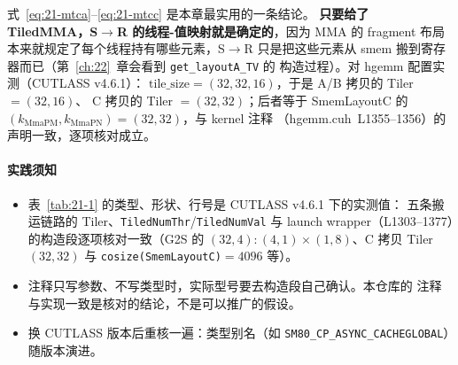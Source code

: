 式~\eqref{eq:21-mtca}--\eqref{eq:21-mtcc} 是本章最实用的一条结论。
\textbf{只要给了 TiledMMA，S$\to$R 的线程-值映射就是确定的}，因为 MMA 的
fragment 布局本来就规定了每个线程持有哪些元素，S$\to$R 只是把这些元素从
smem 搬到寄存器而已（第~\ref{ch:22}~章会看到 \texttt{get\_\allowbreak{}layout\allowbreak{}A\_\allowbreak{}TV} 的
构造过程）。对 hgemm 配置实测（CUTLASS v4.6.1）：
$\mathrm{tile\_size} = (32,32,16)$，于是 A/B 拷贝的 Tiler $=(32,16)$、
C 拷贝的 Tiler $=(32,32)$；后者等于 SmemLayoutC 的
$(k_{\mathrm{MmaPM}}, k_{\mathrm{MmaPN}}) = (32,32)$，与 kernel 注释
（hgemm.cuh~L1355--1356）的声明一致，逐项核对成立。

\paragraph{实践须知}
\begin{itemize}
  \item 表~\ref{tab:21-1} 的类型、形状、行号是 CUTLASS v4.6.1 下的实测值：
        五条搬运链路的 Tiler、\texttt{TiledNumThr}/\texttt{TiledNumVal}
        与 launch wrapper（L1303--1377）的构造段逐项核对一致（G2S 的
        $(32,4){:}(4,1)\times(1,8)$、C 拷贝 Tiler $(32,32)$ 与
        \texttt{cosize\allowbreak{}(Smem\allowbreak{}Layout\allowbreak{}C)}$=4096$ 等）。
  \item 注释只写参数、不写类型时，实际型号要去构造段自己确认。本仓库的
        注释与实现一致是核对的结论，不是可以推广的假设。
  \item 换 CUTLASS 版本后重核一遍：类型别名（如
        \texttt{SM80\_\allowbreak{}CP\_\allowbreak{}ASYNC\_\allowbreak{}CACHEGLOBAL}）随版本演进。
\end{itemize}

